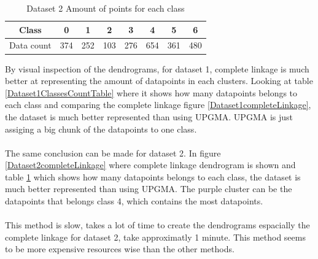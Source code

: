 \documentclass[12pt]{report}
\begin{document}
	\begin{table}[H]
		\centering
		\begin{tabular}{|c|c|c|c|c|c|c|c|}
			\hline
			Class & 0 & 1 & 2 & 3 & 4 & 5 & 6 \\
			\hline
			Data count & 374 & 252 & 103 & 276 & 654 & 361 & 480 \\
			\hline
		\end{tabular}
		\caption{Dataset 2 Amount of points for each class}
		\label{Dataset2ClassesCountTable}
	\end{table}

	By visual inspection of the dendrograms, for dataset 1, complete linkage is much better at representing the amount of datapoints in each clusters. Looking at table \ref{Dataset1ClassesCountTable} where it shows how many datapoints belongs to each class and comparing the complete linkage figure \ref{Dataset1completeLinkage}, the dataset is much better represented than using UPGMA. UPGMA is just assiging a big chunk of the datapoints to one class.\\
	\\
	The same conclusion can be made for dataset 2. In figure \ref{Dataset2completeLinkage} where complete linkage dendrogram is shown and table \ref{Dataset2ClassesCountTable} which shows how many datapoints belongs to each class, the dataset is much better represented than using UPGMA. The purple cluster can be the datapoints that belongs class 4, which contains the most datapoints.\\
	\\
	This method is slow, takes a lot of time to create the dendrograms espacially the complete linkage for dataset 2, take approximatly 1 minute. This method seems to be more expensive resources wise than the other methods.
\end{document}
